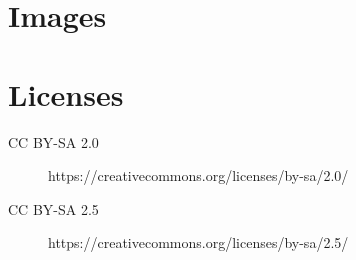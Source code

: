 \documentclass[parskip=half,final,oneside,a4paper]{scrartcl}
\def\imagecopyrights{}
\begin{document}











  \section{Images}
  \begin{enumerate}
    \imagecopyrights
  \end{enumerate}

  \section{Licenses}

  \begin{description}
    \item[CC BY-SA 2.0] https://creativecommons.org/licenses/by-sa/2.0/
    \item[CC BY-SA 2.5] https://creativecommons.org/licenses/by-sa/2.5/
  \end{description}
\end{document}
